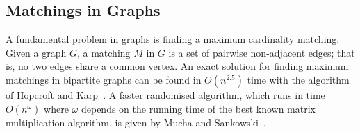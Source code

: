 

%
%
%
\subsection{Matchings in Graphs}
A fundamental problem in graphs is finding a maximum cardinality matching. Given a graph $G$, a matching $M$ in $G$ is a set of pairwise non-adjacent edges; that is, no two edges share a common vertex. An exact solution for finding maximum matchings in bipartite graphs can be found in $O(n^{2.5})$ time with the algorithm of Hopcroft and Karp~\cite{Hopcroft}. A faster randomised algorithm, which runs in time $O(n^{\omega})$ where $\omega$ depends on the running time of the best known matrix multiplication algorithm, is given by Mucha and Sankowski~\cite{MS04}. 

